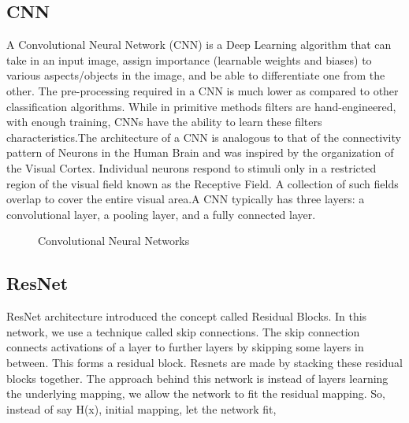         \subsection{CNN}
            A Convolutional Neural Network (CNN) is a Deep Learning algorithm
            that can take in an input image, assign importance (learnable weights and biases) to various aspects/objects in the image, and be able to differentiate one from the other. The pre-processing required in a CNN is much lower as compared to other classification algorithms. While in primitive methods filters are hand-engineered, with enough training, CNNs have the ability to learn these filters characteristics.The architecture of a CNN is analogous to that of the connectivity pattern of Neurons in the Human Brain and was inspired by the organization of the Visual Cortex. Individual neurons respond to stimuli only in a restricted region of the visual field known as the Receptive Field. A collection of such fields overlap to cover the entire visual area.A CNN typically has three layers: a convolutional layer, a pooling layer, and a fully connected layer.

        \begin{figure}[hbt!]
                \caption{Convolutional Neural Networks}
        \end{figure}

        \subsection{ResNet}
            ResNet architecture introduced the concept called Residual Blocks. In this network, we use a technique called skip connections. The skip connection connects activations of a  layer to further layers by skipping some layers in between. This forms a residual block. Resnets are made by stacking these residual blocks together. The approach behind this network is instead of layers learning the underlying mapping, we allow the network to fit the residual mapping. So, instead of say H(x), initial mapping, let the network fit,

